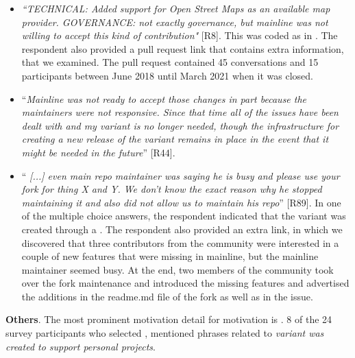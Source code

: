 \begin{itemize}[leftmargin=*]
\item \emph{``TECHNICAL: Added support for Open Street Maps as an available map provider. GOVERNANCE: not exactly governance, but mainline was not willing to accept this kind of contribution"} [R8]. This was coded as  in . The respondent also provided a \gh pull request link that contains extra information, that we examined. The pull request contained 45 conversations and 15 participants between June 2018 until March 2021 when it was closed.

\item ``\emph{Mainline was not ready to accept those changes in part because the maintainers were not responsive. Since that time all of the issues have been dealt with and my variant is no longer needed, though the infrastructure for creating a new release of the variant remains in place in the event that it might be needed in the future}'' [R44].

\item ``\emph{%
[...] even main repo maintainer was saying he is busy and please use your fork for thing X and Y. We don't know the exact reason why he stopped maintaining it and also did not allow us to maintain his repo}'' [R89]. In one of the multiple choice answers, the respondent indicated that the variant was created through a  .
The respondent also provided an extra link, in which we discovered that
three contributors from the community were interested in a couple of new features that were missing in mainline, but the mainline maintainer seemed busy. At the end, two members of the community took over the fork maintenance and introduced the missing features and advertised the additions in the \textsf{readme.md} file of the fork as well as in the issue.

\end{itemize}


\nd \textbf{Others}. %
The most prominent motivation detail for  motivation is  . 8 of the 24 survey participants who selected , mentioned phrases related to \emph{variant was created to support personal projects}.


